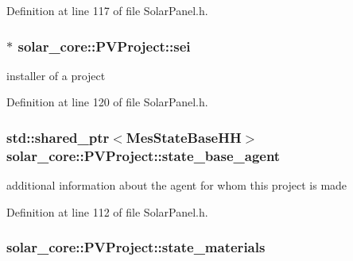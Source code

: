 Definition at line 117 of file Solar\+Panel.\+h.

\hypertarget{classsolar__core_1_1_p_v_project_af8fdd82137a3b0aa277ae6b9663fcb33}{}
\subsubsection[{sei}]{$\ast$ solar\+\_\+core\+::\+P\+V\+Project\+::sei}\label{classsolar__core_1_1_p_v_project_af8fdd82137a3b0aa277ae6b9663fcb33}
installer of a project 

Definition at line 120 of file Solar\+Panel.\+h.

\hypertarget{classsolar__core_1_1_p_v_project_a1a3576ddac7b82f9a2d7c139af9850d2}{}
\subsubsection[{state\+\_\+base\+\_\+agent}]{\setlength{\rightskip}{0pt plus 5cm}std\+::shared\+\_\+ptr$<${\bf Mes\+State\+Base\+H\+H}$>$ solar\+\_\+core\+::\+P\+V\+Project\+::state\+\_\+base\+\_\+agent}\label{classsolar__core_1_1_p_v_project_a1a3576ddac7b82f9a2d7c139af9850d2}
additional information about the agent for whom this project is made 

Definition at line 112 of file Solar\+Panel.\+h.

\hypertarget{classsolar__core_1_1_p_v_project_aaac22e629b55f970a4ad43b1fcd756d1}{}
\subsubsection[{state\+\_\+materials}]{ solar\+\_\+core\+::\+P\+V\+Project\+::state\+\_\+materials}\label{classsolar__core_1_1_p_v_project_aaac22e629b55f970a4ad43b1fcd756d1}


